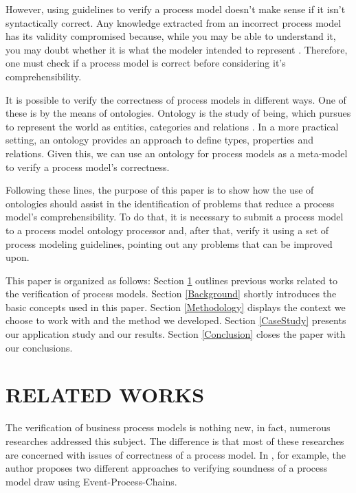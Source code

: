\documentclass[a4paper,twoside]{article}
\begin{document}
However, using guidelines to verify a process model doesn't make sense if it isn't syntactically correct. Any knowledge extracted from an incorrect process model has its validity compromised because, while you may be able to understand it, you may doubt whether it is what the modeler intended to represent \cite{Reijers2015}. Therefore, one must check if a process model is correct before considering it's comprehensibility.


It is possible to verify the correctness of process models in  different ways. One of these is by the means of ontologies. Ontology is the study of being, which pursues to represent the world as entities, categories and relations \cite{Guizzardi2012} \cite{Mendling2008}. In a more practical setting, an ontology provides an approach to define types, properties and relations. Given this, we can use an ontology for process models as a meta-model to verify a process model's correctness.


Following these lines, the purpose of this paper is to show how the use of ontologies should assist in the identification of problems that reduce a process model's comprehensibility. To do that, it is necessary to submit a process model to a process model ontology processor and, after that, verify it using a set of process modeling guidelines, pointing out any problems that can be improved upon.


This paper is organized as follows: Section \ref{RelatedWorks} outlines previous works related to the verification of process models. Section \ref{Background} shortly introduces the basic concepts used in this paper. Section \ref{Methodology} displays the context we choose to work with and the method we developed. Section \ref{CaseStudy} presents our application study and our results. Section \ref{Conclusion} closes the paper with our conclusions.

\section{RELATED WORKS}\label{RelatedWorks}


\noindent The verification of business process models is nothing new, in fact, numerous researches addressed this subject. The difference is that most of these researches are concerned with issues of correctness of a process model. In \cite{Mendling2008}, for example, the author proposes two different approaches to verifying soundness of a process model draw using Event-Process-Chains.
	
\end{document}
